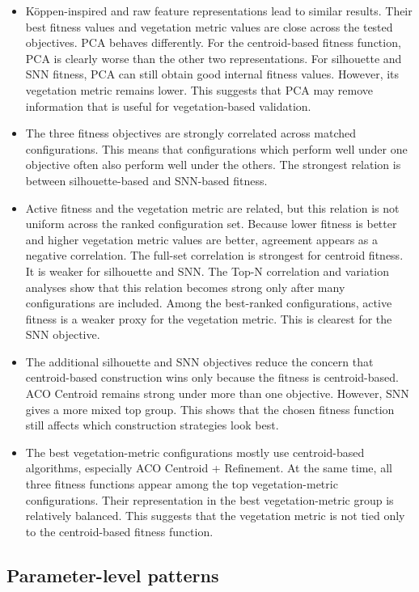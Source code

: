 \documentclass[11pt]{article}
\begin{document}
\begin{itemize}
  \item Köppen-inspired and raw feature representations lead to similar results. Their best fitness values and vegetation metric values are close across the tested objectives. PCA behaves differently. For the centroid-based fitness function, PCA is clearly worse than the other two representations. For silhouette and SNN fitness, PCA can still obtain good internal fitness values. However, its vegetation metric remains lower. This suggests that PCA may remove information that is useful for vegetation-based validation.
  \item The three fitness objectives are strongly correlated across matched configurations. This means that configurations which perform well under one objective often also perform well under the others. The strongest relation is between silhouette-based and SNN-based fitness.
  \item Active fitness and the vegetation metric are related, but this relation is not uniform across the ranked configuration set. Because lower fitness is better and higher vegetation metric values are better, agreement appears as a negative correlation. The full-set correlation is strongest for centroid fitness. It is weaker for silhouette and SNN. The Top-N correlation and variation analyses show that this relation becomes strong only after many configurations are included. Among the best-ranked configurations, active fitness is a weaker proxy for the vegetation metric. This is clearest for the SNN objective.
  \item The additional silhouette and SNN objectives reduce the concern that centroid-based construction wins only because the fitness is centroid-based. ACO Centroid remains strong under more than one objective. However, SNN gives a more mixed top group. This shows that the chosen fitness function still affects which construction strategies look best.
  \item The best vegetation-metric configurations mostly use centroid-based algorithms, especially ACO Centroid + Refinement. At the same time, all three fitness functions appear among the top vegetation-metric configurations. Their representation in the best vegetation-metric group is relatively balanced. This suggests that the vegetation metric is not tied only to the centroid-based fitness function.
\end{itemize}


\subsection{Parameter-level patterns}
\end{document}
